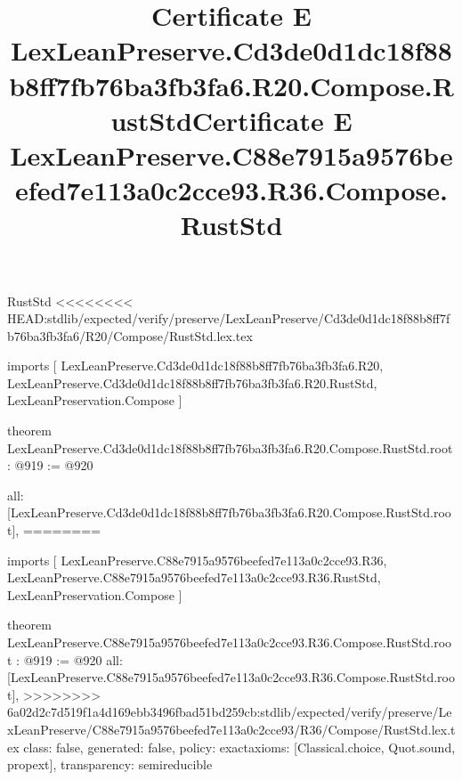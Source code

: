 \begin{lexlean}{RustStd}
<<<<<<<< HEAD:stdlib/expected/verify/preserve/LexLeanPreserve/Cd3de0d1dc18f88b8ff7fb76ba3fb3fa6/R20/Compose/RustStd.lex.tex
\title{Certificate E LexLeanPreserve.Cd3de0d1dc18f88b8ff7fb76ba3fb3fa6.R20.Compose.RustStd}
\begin{coremodule}
imports [
  LexLeanPreserve.Cd3de0d1dc18f88b8ff7fb76ba3fb3fa6.R20,
  LexLeanPreserve.Cd3de0d1dc18f88b8ff7fb76ba3fb3fa6.R20.RustStd,
  LexLeanPreservation.Compose
]

theorem LexLeanPreserve.Cd3de0d1dc18f88b8ff7fb76ba3fb3fa6.R20.Compose.RustStd.root : @919 := @920 {
  all: [LexLeanPreserve.Cd3de0d1dc18f88b8ff7fb76ba3fb3fa6.R20.Compose.RustStd.root],
========
\title{Certificate E LexLeanPreserve.C88e7915a9576beefed7e113a0c2cce93.R36.Compose.RustStd}
\begin{coremodule}
imports [
  LexLeanPreserve.C88e7915a9576beefed7e113a0c2cce93.R36,
  LexLeanPreserve.C88e7915a9576beefed7e113a0c2cce93.R36.RustStd,
  LexLeanPreservation.Compose
]

theorem LexLeanPreserve.C88e7915a9576beefed7e113a0c2cce93.R36.Compose.RustStd.root : @919 := @920 {
  all: [LexLeanPreserve.C88e7915a9576beefed7e113a0c2cce93.R36.Compose.RustStd.root],
>>>>>>>> 6a02d2c7d519f1a4d169ebb3496fbad51bd259cb:stdlib/expected/verify/preserve/LexLeanPreserve/C88e7915a9576beefed7e113a0c2cce93/R36/Compose/RustStd.lex.tex
  class: false,
  generated: false,
  policy: exact{axioms: [Classical.choice, Quot.sound, propext]},
  transparency: semireducible
}


\end{coremodule}}
\end{coremodule}
\end{lexlean}
